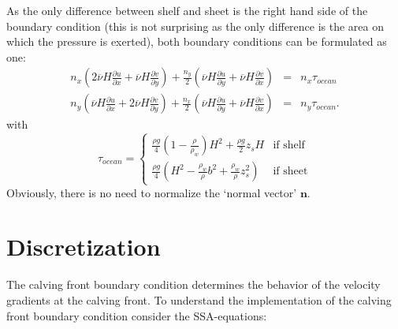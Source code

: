 \documentclass[a4paper,10pt]{article}
\begin{document}
As the only difference between shelf and sheet is the right hand side of the boundary condition (this is not surprising as the only difference is the area on which the pressure is exerted), both boundary conditions can be formulated as one:
\begin{eqnarray}%
n_x\left(2\overline{\nu}H\frac{\partial u}{\partial x}+\overline{\nu}H\frac{\partial v}{\partial y}  \right) + \frac{n_y}{2} \left(\overline{\nu}H\frac{\partial u}{\partial y} + \overline{\nu}H\frac{\partial v}{\partial x} \right) & =  & n_x\tau_{ocean} \label{BC1}\\  
 n_y\left(\overline{\nu}H\frac{\partial u}{\partial x}+2\overline{\nu}H\frac{\partial v}{\partial y}  \right) + \frac{n_x}{2} \left(\overline{\nu}H\frac{\partial u}{\partial y} + \overline{\nu}H\frac{\partial v}{\partial x} \right) & = & n_y\tau_{ocean}. \label{BC2}
\end{eqnarray}
with 
\begin{equation}
\tau_{ocean} = \left\{
\begin{array}{ll}
\frac{\rho g}{4}\left(1-\frac{\rho}{\rho_w}\right)H^2 + \frac{\rho g}{2}z_sH  & \text{if shelf} \\
\frac{\rho g}{4}\left(H^2-\frac{\rho_w}{\rho}b^2+\frac{\rho_w}{\rho}z_s^2 \right) & \text{if sheet}
\end{array} \right.
\end{equation}
Obviously, there is no need to normalize the `normal vector' $\mathbf{n}$.
\section{Discretization}

\noindent The calving front boundary condition determines the behavior of the velocity gradients at the calving front. To understand the implementation of the calving front boundary condition consider the SSA-equations:
\end{document}
